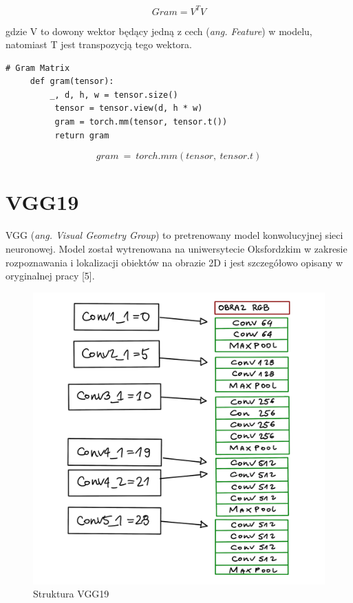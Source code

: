 \documentclass[brudnopis]{xmgr}
\begin{document}
\begin{equation}
Gram = V^TV
\end{equation}

gdzie V to dowony wektor będący jedną z cech (\textit{ang. Feature}) w modelu, natomiast T jest transpozycją tego wektora. 
\begin{lstlisting}
# Gram Matrix
	 def gram(tensor):
	 	 _, d, h, w = tensor.size()
          tensor = tensor.view(d, h * w)
          gram = torch.mm(tensor, tensor.t())
          return gram
\end{lstlisting}


\begin{equation}
gram\:=\:torch.mm (tensor,\:tensor.t)
\end{equation}

\section{VGG19\label{s:dsssl}}

VGG (\textit{ang. Visual Geometry Group}) to pretrenowany model konwolucyjnej sieci neuronowej. 
Model został wytrenowana na uniwersytecie Oksfordzkim w zakresie rozpoznawania i lokalizacji obiektów na obrazie 2D i jest szczegółowo opisany w oryginalnej pracy [5].

\begin{figure}[!tbh]
\centering
\includegraphics[width=.8\hsize]{fig/7}
\caption{Struktura VGG19\label{RYS.4}}
\end{figure}
\end{document}
